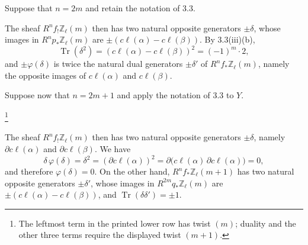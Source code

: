 Suppose that $n=2m$ and retain the notation of 3.3.


\begin{center}
\end{center}

The sheaf $R^nf_!\mathbb Z_\ell(m)$ then has two natural opposite
generators $\pm\delta$, whose images in
$R^np_*\mathbb Z_\ell(m)$ are
$\pm(c\ell(\alpha)-c\ell(\beta))$.  By 3.3(iii)(b),
\begin{equation*}
\operatorname{Tr}(\delta^2)
=(c\ell(\alpha)-c\ell(\beta))^2=(-1)^m\cdot2,
\end{equation*}
and $\pm\varphi(\delta)$ is twice the natural dual generators
$\pm\delta'$ of $R^nf_*\mathbb Z_\ell(m)$, namely the opposite images
of $c\ell(\alpha)$ and $c\ell(\beta)$.

Suppose now that $n=2m+1$ and apply the notation of 3.3 to $Y$.

\begin{center}
\end{center}

\footnote{The leftmost term in the printed lower row has twist $(m)$;
duality and the other three terms require the displayed twist $(m+1)$.}

The sheaf $R^nf_!\mathbb Z_\ell(m)$ then has two natural opposite
generators $\pm\delta$, namely
$\partial c\ell(\alpha)$ and $\partial c\ell(\beta)$.  We have
\begin{equation*}
\delta\,\varphi(\delta)=\delta^2
=(\partial c\ell(\alpha))^2
=\partial\bigl(c\ell(\alpha)\,\partial c\ell(\alpha)\bigr)=0,
\end{equation*}
and therefore $\varphi(\delta)=0$.  On the other hand,
$R^nf_*\mathbb Z_\ell(m+1)$ has two natural opposite generators
$\pm\delta'$, whose images in $R^{2m}q_*\mathbb Z_\ell(m)$ are
$\pm(c\ell(\alpha)-c\ell(\beta))$, and
$\operatorname{Tr}(\delta\delta')=\pm1$.


